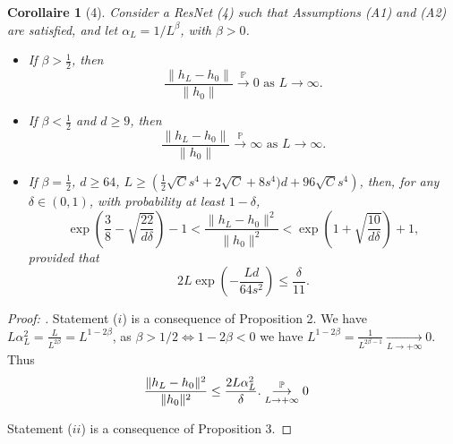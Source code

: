 \documentclass{article}
\theoremstyle{plain}%
\newtheorem*{cor}{Corollaire}
\theoremstyle{definition}
\theoremstyle{remark}
\begin{document}
\begin{cor}[4]
    Consider a ResNet (4) such that Assumptions (A1) and (A2) are satisfied, and let $\alpha_L = 1/L^\beta$, with $\beta > 0$.
\begin{itemize}
    \item[(i)] If $\beta > \frac{1}{2}$, then
    \[
    \frac{\|h_L - h_0\|}{\|h_0\|} \xrightarrow{\mathbb{P}} 0 \text{ as } L \to \infty.
    \]
    \item[(ii)] If $\beta < \frac{1}{2}$ and $d \geq 9$, then
    \[
    \frac{\|h_L - h_0\|}{\|h_0\|} \xrightarrow{\mathbb{P}} \infty \text{ as } L \to \infty.
    \]
    \item[(iii)] If $\beta = \frac{1}{2}$, $d \geq 64$, $L \geq \left(\frac{1}{2}\sqrt{C}s^4 + 2\sqrt{C} + 8s^4)d + 96\sqrt{C}s^4\right)$, then, for any $\delta \in (0, 1)$, with probability at least $1 - \delta$,
    \[
    \exp\left(\frac{3}{8} - \sqrt{\frac{22}{d\delta}}\right) - 1 < \frac{\|h_L - h_0\|^2}{\|h_0\|^2} < \exp\left(1 + \sqrt{\frac{10}{d\delta}}\right) + 1,
    \]
    provided that
    \[
    2L \exp\left(-\frac{Ld}{64s^2}\right) \leq \frac{\delta}{11}.
    \]
\end{itemize}

\end{cor}
\begin{proof}[Proof: ]
    Statement ($ i $) is a consequence of Proposition 2. We have $ L \alpha _L ^2 = \frac{L}{L^{2\beta} } = L^{1 - 2 \beta } $, as $ \beta > 1/2 \Leftrightarrow 1 - 2 \beta < 0$ we have $L^{1 - 2 \beta } = \frac{1}{L^{2 \beta  -1}} \underset{L\to +\infty}{\longrightarrow} 0 $. Thus
    \begin{align*}
        & \frac{\|h_L - h_0\|^2}{\|h_0\|^2} \leq \frac{2L\alpha_L^2}{\delta}.
        \overunderset{\mathbb{P}}{L\to +\infty}{\longrightarrow} 0 
    \end{align*}

    Statement ($ ii $) is a consequence of Proposition 3.
\end{proof}
\end{document}

